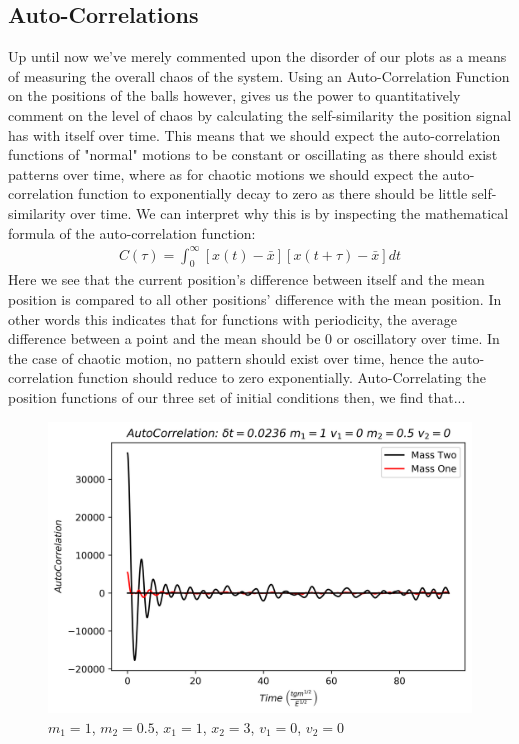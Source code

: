 \documentclass[twocolumn]{article}
\begin{document}
\subsection{Auto-Correlations}
\hspace{\parindent}Up until now we've merely commented upon the disorder of our plots as a means of measuring the overall chaos of the system. Using an Auto-Correlation Function on the positions of the balls however, gives us the power to quantitatively comment on the level of chaos by calculating the self-similarity the position signal has with itself over time. This means that we should expect the auto-correlation functions of "normal" motions to be constant or oscillating as there should exist patterns over time, where as for chaotic motions we should expect the auto-correlation function to exponentially decay to zero as there should be little self-similarity over time. We can interpret why this is by inspecting the mathematical formula of the auto-correlation function:
\begin{align}
	C(\tau)=\int_{0}^{\infty}[x(t)-\bar{x}][x(t+\tau)-\bar{x}]dt
\end{align}
Here we see that the current position's difference between itself and the mean position is compared to all other positions' difference with the mean position. In other words this indicates that for functions with periodicity, the average difference between a point and the mean should be $0$ or oscillatory over time. In the case of chaotic motion, no pattern should exist over time, hence the auto-correlation function should reduce to zero exponentially. Auto-Correlating the position functions of our three set of initial conditions then, we find that... \\
\begin{figure}[H]
\caption{$m_1=1$, $m_2=0.5$, $x_1=1$, $x_2=3$, $v_1=0$, $v_2=0$}
\centering
\includegraphics[scale=.45]{Correlation-1-v2}
\end{figure}
\end{document}
